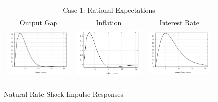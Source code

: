 \begin{figure}
\caption{Natural Rate Shock Impulse Responses}\label{fg:irf_nat}
\vspace*{1pc}
\begin{tabular}{ccc}
\multicolumn{3}{c}{Case 1: Rational Expectations}\\
Output Gap & Inflation & Interest Rate \\ 
\includegraphics[scale=0.28]{results_re/Output_natshock_irf.png} & 
\includegraphics[scale=0.28]{results_re/Inflation_natshock_irf.png} & 
\includegraphics[scale=0.28]{results_re/Interest_Rate_natshock_irf.png} \\ \\ 

\end{tabular}
\end{figure}
